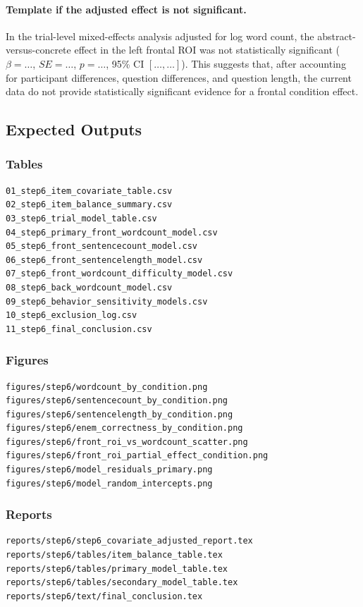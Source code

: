 \documentclass[11pt]{article}
\begin{document}
\paragraph{Template if the adjusted effect is not significant.}
In the trial-level mixed-effects analysis adjusted for log word count, the abstract-versus-concrete
effect in the left frontal ROI was not statistically significant
(\(\beta=\ldots\), \(SE=\ldots\), \(p=\ldots\), 95\% CI \([\ldots,\ldots]\)).
This suggests that, after accounting for participant differences, question differences, and question
length, the current data do not provide statistically significant evidence for a frontal condition effect.

\subsection{Expected Outputs}

\subsubsection*{Tables}
\begin{verbatim}
01_step6_item_covariate_table.csv
02_step6_item_balance_summary.csv
03_step6_trial_model_table.csv
04_step6_primary_front_wordcount_model.csv
05_step6_front_sentencecount_model.csv
06_step6_front_sentencelength_model.csv
07_step6_front_wordcount_difficulty_model.csv
08_step6_back_wordcount_model.csv
09_step6_behavior_sensitivity_models.csv
10_step6_exclusion_log.csv
11_step6_final_conclusion.csv
\end{verbatim}

\subsubsection*{Figures}
\begin{verbatim}
figures/step6/wordcount_by_condition.png
figures/step6/sentencecount_by_condition.png
figures/step6/sentencelength_by_condition.png
figures/step6/enem_correctness_by_condition.png
figures/step6/front_roi_vs_wordcount_scatter.png
figures/step6/front_roi_partial_effect_condition.png
figures/step6/model_residuals_primary.png
figures/step6/model_random_intercepts.png
\end{verbatim}

\subsubsection*{Reports}
\begin{verbatim}
reports/step6/step6_covariate_adjusted_report.tex
reports/step6/tables/item_balance_table.tex
reports/step6/tables/primary_model_table.tex
reports/step6/tables/secondary_model_table.tex
reports/step6/text/final_conclusion.tex
\end{verbatim}
\end{document}
